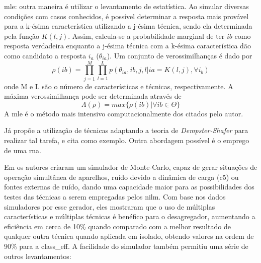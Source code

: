 \begin{enumerate}[label=\textbf{2.\arabic*},wide=\parindent]
\begin{description}
\item \gls{mle}: outra maneira é utilizar o levantamento de
estatística. Ao simular diversas condições com casos conhecidos, é
possível determinar a resposta mais provável para a k-ésima
característica utilizando a j-ésima técnica, sendo ela
determinada pela função $K(l,j)$. Assim, calcula-se a probabilidade
marginal de ter $ib$ como resposta verdadeira enquanto a j-ésima
técnica com a k-ésima característica dão como candidato a resposta
$i_a$ ($\theta_{ia}$). Um conjunto de verossimilhanças é dado por
\begin{equation}
\rho(ib) = \prod_{j=1}^M\prod_{l=1}^L
p(\theta_{ia},ib,j,l|ia=K(l,j),\forall i_b)
\end{equation}
onde M e L são o número de características e técnicas,
respectivamente. A máxima verossimilhança pode ser determinada através de 
\begin{equation}
\Lambda(\rho)=max\{\rho(ib)|\forall ib\in\Theta\}
\end{equation}
A \gls{mle} é o método mais intensivo computacionalmente dos citados
pelo autor.
\end{description}

Já \cite{nilm_zeifman_review_2011} propõe a utilização de
técnicas adaptando a teoria de \emph{Dempster-Shafer} para realizar
tal tarefa, e cita \cite{information_fusion_basir_2007_40} como
exemplo. Outra abordagem possível é o emprego de uma \gls{rna}.

Em \cite{nilm_liang_pt2_2010_40} os autores criaram um simulador de
Monte-Carlo, capaz de gerar situações de operação simultânea de aparelhos,
ruído devido a dinâmica de carga (\gls{c5}) ou fontes externas de
ruído, dando uma capacidade maior para as possibilidades dos
testes das técnicas a serem empregadas pelos \gls{nilm}. Com base nos
dados simuladores por esse gerador, eles mostraram que o uso de
múltiplas características e múltiplas técnicas é benéfico para o
desagregador, aumentando a eficiência em cerca de 10\% quando
comparado com a melhor resultado de qualquer outra técnica quando
aplicada em isolado, obtendo valores na ordem de 90\% para a
\acs{class_eff}. A facilidade do simulador também permitiu uma
série de outros levantamentos:


\end{enumerate}
